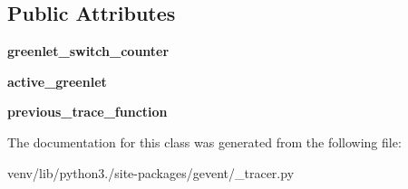 \subsection*{Public Attributes}
\begin{DoxyCompactItemize}
\item 
\mbox{\label{classgevent_1_1__tracer_1_1_greenlet_tracer_abeec5d4e511f33a47561827f5f061952}} 
{\bfseries greenlet\+\_\+switch\+\_\+counter}
\item 
\mbox{\label{classgevent_1_1__tracer_1_1_greenlet_tracer_a70a797708e63ef354b999c375833da91}} 
{\bfseries active\+\_\+greenlet}
\item 
\mbox{\label{classgevent_1_1__tracer_1_1_greenlet_tracer_ad0b7c7ebc4c7058c2e1e19390e5541e1}} 
{\bfseries previous\+\_\+trace\+\_\+function}
\end{DoxyCompactItemize}


The documentation for this class was generated from the following file\+:\begin{DoxyCompactItemize}
\item 
venv/lib/python3./site-\/packages/gevent/\+\_\+tracer.\+py\end{DoxyCompactItemize}
